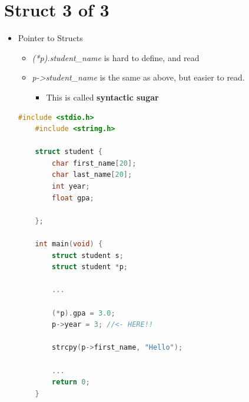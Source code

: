 \documentclass[12pt]{article}
\begin{document}
\bigskip

\section*{Struct 3 of 3}

\bigskip

\begin{itemize}
    \item Pointer to Structs
    \begin{itemize}
        \item \textit{(*p).student\_name} is hard to define, and read
        \item \textit{p-\textgreater student\_name} is the same as above, but easier to read.
        \begin{itemize}
            \item This is called \textbf{syntactic sugar}
        \end{itemize}
    \end{itemize}

    \begin{lstlisting}[language=c,caption={struct\_example\_3.c}]
    #include <stdio.h>
    #include <string.h>

    struct student {
        char first_name[20];
        char last_name[20];
        int year;
        float gpa;

    };

    int main(void) {
        struct student s;
        struct student *p;

        ...

        (*p).gpa = 3.0;
        p->year = 3; //<- HERE!!

        strcpy(p->first_name, "Hello");

        ...
        return 0;
    }
    \end{lstlisting}
\end{itemize}
\end{document}
